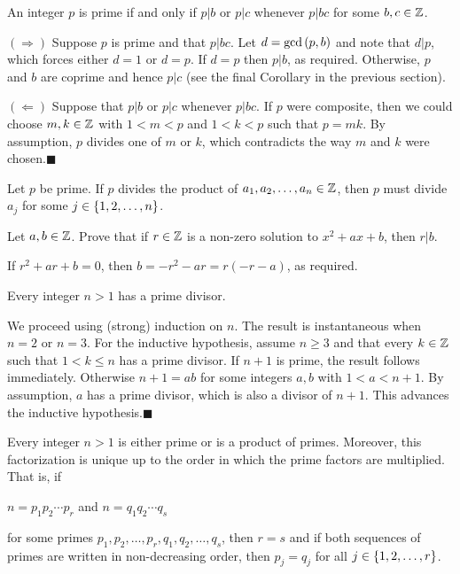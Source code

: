 \documentclass[11pt,fleqn,dvipsnames,usenames]{article}
\newcommand{\p}{\noindent}
\newcommand{\ENDPRF}{\hfill $\blacksquare$}
\begin{document}
\begin{theorem}\label{euclidslemma}
An integer $p$ is prime if and only if $p|b$ or $p|c$ whenever $p|bc$ for some $b,c\in\mathbb{Z}$.
\vsp

\prf $(\Rightarrow)$ Suppose $p$ is prime and that $p|bc$.  Let $d = \text{gcd}\left(p,b\right)$ and note that $d|p$, which forces either $d = 1$ or $d = p$.  If $d = p$ then $p|b$, as required.  Otherwise, $p$ and $b$ are coprime and hence $p|c$ (see the final Corollary in the previous section).
\vsp

\p $(\Leftarrow)$ Suppose that $p|b$ or $p|c$ whenever $p|bc$.  If $p$ were composite, then we could choose $m,k\in\mathbb{Z}$ with $1 < m < p$ and $1 < k < p$ such that $p = mk$.  By assumption, $p$ divides one of $m$ or $k$, which contradicts the way $m$ and $k$ were chosen.\ENDPRF
\end{theorem}

\crlry Let $p$ be prime.  If $p$ divides the product of $a_{1},a_{2},\ldots, a_{n}\in\mathbb{Z}$, then $p$ must divide $a_{j}$ for some $j\in\left\{1,2,\ldots, n\right\}$.
\vsp

\begin{example}
Let $a,b\in\mathbb{Z}$.  Prove that if $r\in\mathbb{Z}$ is a non-zero solution to $x^2 + ax + b$, then $r|b$.
\end{example}

\solution If $r^2 + ar + b = 0$, then $b = -r^2 - ar = r(-r - a)$, as required.
\vsp

\lema Every integer $n > 1$ has a prime divisor.
\vsp

\prf We proceed using (strong) induction on $n$.  The result is instantaneous when $n=2$ or $n=3$.
For the inductive hypothesis, assume $n\geq 3$ and that every $k\in \mathbb{Z}$ such that $1 < k \leq n$ has a prime divisor.  If $n+1$ is prime, the result follows immediately.  Otherwise $n+1 = ab$ for some integers $a,b$ with $1 < a < n+1$.  By assumption, $a$ has a prime divisor, which is also a divisor of $n+1$.  This advances the inductive hypothesis.\ENDPRF
\vsp

 Every integer $n > 1$ is either prime or is a product of primes.  Moreover, this factorization is unique up to the order in which the prime factors are multiplied.  That is, if
\begin{center}
$n = p_{1}p_{2}\cdots p_{r}$ and $n = q_{1}q_{2}\cdots q_{s}$
\end{center}
for some primes $p_{1},p_{2},\ldots, p_{r},q_{1},q_{2},\ldots,q_{s}$, then $r = s$ and if both sequences of primes are written in non-decreasing order, then $p_{j} = q_{j}$ for all $j\in\left\{1,2,\ldots, r\right\}$.
\vsp
\end{document}
